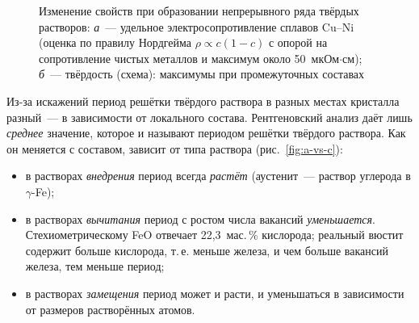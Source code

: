 \begin{figure}[ht]
\centering
\begin{subfigure}[b]{0.48\textwidth}\centering
{}
\caption{}
\end{subfigure}\hfill
\begin{subfigure}[b]{0.48\textwidth}\centering
{}
\caption{}
\end{subfigure}
\caption{Изменение свойств при образовании непрерывного ряда твёрдых
растворов: \textit{а}~— удельное электросопротивление сплавов Cu--Ni
(оценка по правилу Нордгейма $\rho\propto c(1-c)$ с опорой на
сопротивление чистых металлов и максимум около 50~мкОм$\cdot$см);
\textit{б}~— твёрдость (схема): максимумы при промежуточных составах}
\label{fig:ss-props}
\end{figure}

Из-за искажений период решётки твёрдого раствора в разных местах
кристалла разный~— в зависимости от локального состава. Рентгеновский
анализ даёт лишь \emph{среднее} значение, которое и называют периодом
решётки твёрдого раствора. Как он меняется с составом, зависит от типа
раствора (рис.~\ref{fig:a-vs-c}):
\begin{itemize}
\item в растворах \emph{внедрения} период всегда \emph{растёт}
(аустенит~— раствор углерода в $\gamma$-Fe);
\item в растворах \emph{вычитания} период с ростом числа вакансий
\emph{уменьшается}. Стехиометрическому FeO отвечает 22,3~мас.\,\%
кислорода; реальный вюстит содержит больше кислорода, т.\,е. меньше
железа, и чем больше вакансий железа, тем меньше период;
\item в растворах \emph{замещения} период может и расти, и уменьшаться в
зависимости от размеров растворённых атомов.
\end{itemize}

